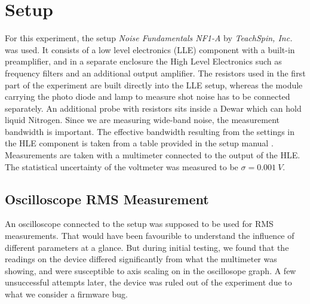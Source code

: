 \documentclass[
    parskip=half, 
    twoside=false,
    twocolumn=true,
    fontsize=11pt,
]{scrarticle}
\begin{document}
\section{Setup}
For this experiment, the setup \textit{Noise Fundamentals NF1-A} by \textit{TeachSpin, Inc.} was used. It consists of a low level electronics (LLE) component with a built-in preamplifier, and in a separate enclosure the High Level Electronics such as frequency filters and an additional output amplifier. The resistors used in the first part of the experiment are built directly into the LLE setup, whereas the module carrying the photo diode and lamp to measure shot noise has to be connected separately. An additional probe with resistors sits inside a Dewar which can hold liquid Nitrogen. Since we are measuring wide-band noise, the measurement bandwidth is important. The effective bandwidth resulting from the settings in the HLE component is taken from a table provided in the setup manual \autocite{instructions}.\\
Measurements are taken with a multimeter connected to the output of the HLE. The statistical uncertainty of the voltmeter was measured to be $\sigma = \SI{0.001}{V}$.

\subsection*{Oscilloscope RMS Measurement}
An oscilloscope connected to the setup was supposed to be used for RMS measurements. That would have been favourible to understand the influence of different parameters at a glance. But during initial testing, we found that the readings on the device differed significantly from what the multimeter was showing, and were susceptible to axis scaling on in the oscillosope graph. A few unsuccessful attempts later, the device was ruled out of the experiment due to what we consider a firmware bug.\\
\end{document}
